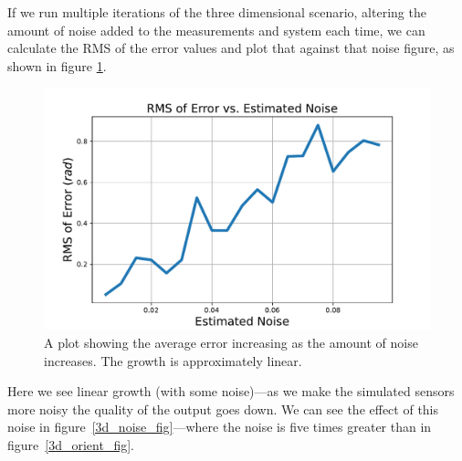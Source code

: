 \documentclass[12pt]{article}
\begin{document}
If we run multiple iterations of the three dimensional scenario, altering the amount of noise added to the measurements and system each time, we can calculate the RMS of the error values and plot that against that noise figure, as shown in figure \ref{3d_rms_fig}.

\begin{figure}[tp]
	\centering
	
	\includegraphics[width=\textwidth]{3d-rms.pdf}
	
	\caption{A plot showing the average error increasing as the amount of noise increases. The growth is approximately linear.}
	
	\label{3d_rms_fig}
\end{figure}

Here we see linear growth (with some noise)---as we make the simulated sensors more noisy the quality of the output goes down. We can see the effect of this noise in figure~\ref{3d_noise_fig}---where the noise is five times greater than in figure~\ref{3d_orient_fig}.
\end{document}
